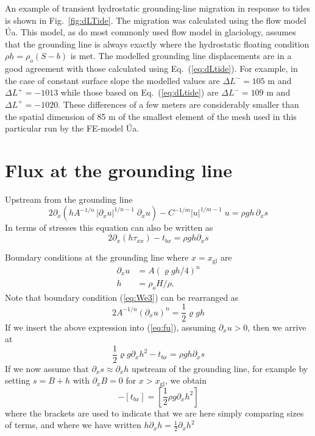 \documentclass[10pt,a4paper]{book}
\newcommand{\p}{\partial}
\newcommand{\txx}{\tau_{xx}}
\newcommand{\xgl}{x_{\mathrm{gl}}}
\begin{document}
An example of transient hydrostatic grounding-line migration in
response to tides is shown in Fig.~\ref{fig:dLTide}. The migration was
calculated using the flow model \'Ua. This model, as do most commonly
used flow model in glaciology, assumes that the grounding line is
always exactly where the hydrostatic floating condition $\rho h=\rho_o
(S-b)$ is met. The modelled grounding line displacements are in a good
agreement with those calculated using Eq.~(\ref{eq:dLtide}). For
example, in the case of constant surface slope the modelled values are
$\Delta L^{-}=105$ m and $\Delta L^{+}=-1013$ while those based on
Eq.~(\ref{eq:dLtide}) are $\Delta L^{-}=109$ m and $\Delta
L^{+}=-1020$. These differences of a few meters are considerably
smaller than the spatial dimension of 85 m of the smallest element of
the mesh used in this particular run by the FE-model \'Ua.





\section{Flux at the grounding line}
\label{sec:FGL}

Upstream from the grounding line
\begin{equation}
  2 \p_x \left (h A^{-1/n} \, | \p_x u|^{1/n-1} \; \p_x u \right ) - C^{-1/m} |u|^{1/m-1} \; u = \rho g h \, \p_x s
\label{eq:fu}
\end{equation}
In terms of stresses this equation can also be written as
\begin{equation}
  2 \p_x (h \txx) -t_{bx}= \rho g h \p_x s
\label{eq:fs}
\end{equation}


Boundary conditions at the grounding line where $x=\xgl$ are
\begin{align}
\p_x u &= A (\varrho g h/4)^n  \label{eq:We3} \\
     h&=\rho_o H /\rho . \label{eq:fc}
\end{align}
Note that boundary condition (\ref{eq:We3}) can be rearranged as
\[
2 A^{-1/n} (\p_x u)^n = \frac{1}{2} \varrho g h
\]
If we insert the above expression into (\ref{eq:fu}), assuming $\p_x u > 0$, then we arrive at
\[
\frac{1}{2}\varrho g \p_x h^2  - t_{bx} = \rho g h \p_x s
\]
If we now assume that $\p_x s \approx \p_x h$ upstream of the
grounding line, for example by setting $s=B+h$ with $\p_x B=0$ for $x>\xgl$, we
obtain
\begin{equation}
[\frac{1}{2} \varrho g \p_x h^2] - [t_{bx}] = [\frac{1}{2} \rho g \p_x h^2]
\label{eq:ghp}
\end{equation}
where the brackets are used to indicate that we are here simply
comparing sizes of terms, and where we have written $ h \p_x h = \frac{1}{2} \p_x h^2 $
\end{document}
